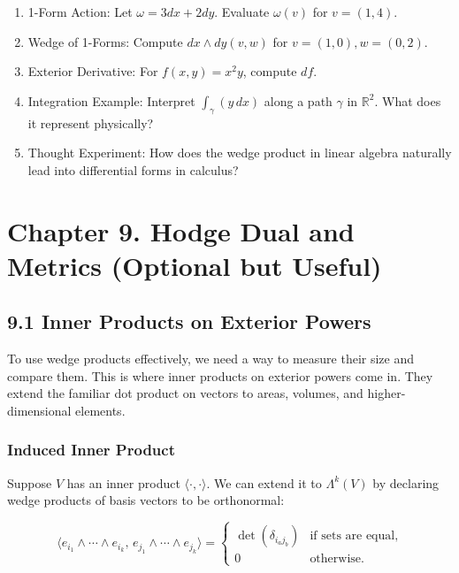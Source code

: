 \documentclass[
  letterpaper,
  DIV=11,
  numbers=noendperiod]{scrreprt}
\begin{document}
\begin{enumerate}
\def\labelenumi{\arabic{enumi}.}
\item
  1-Form Action: Let \(\omega = 3dx + 2dy\). Evaluate \(\omega(v)\) for
  \(v = (1,4)\).
\item
  Wedge of 1-Forms: Compute \(dx \wedge dy(v,w)\) for
  \(v=(1,0), w=(0,2)\).
\item
  Exterior Derivative: For \(f(x,y) = x^2 y\), compute \(df\).
\item
  Integration Example: Interpret \(\int_\gamma (y \, dx)\) along a path
  \(\gamma\) in \(\mathbb{R}^2\). What does it represent physically?
\item
  Thought Experiment: How does the wedge product in linear algebra
  naturally lead into differential forms in calculus?
\end{enumerate}

\section{Chapter 9. Hodge Dual and Metrics (Optional but
Useful)}\label{chapter-9.-hodge-dual-and-metrics-optional-but-useful}

\subsection{9.1 Inner Products on Exterior
Powers}\label{inner-products-on-exterior-powers}

To use wedge products effectively, we need a way to measure their size
and compare them. This is where inner products on exterior powers come
in. They extend the familiar dot product on vectors to areas, volumes,
and higher-dimensional elements.

\subsubsection{Induced Inner Product}\label{induced-inner-product}

Suppose \(V\) has an inner product \(\langle \cdot, \cdot \rangle\). We
can extend it to \(\Lambda^k(V)\) by declaring wedge products of basis
vectors to be orthonormal:

\[
\langle e_{i_1} \wedge \cdots \wedge e_{i_k}, \, e_{j_1} \wedge \cdots \wedge e_{j_k} \rangle =
\begin{cases}
\det(\delta_{i_a j_b}) & \text{if sets are equal}, \\
0 & \text{otherwise}.
\end{cases}
\]
\end{document}

